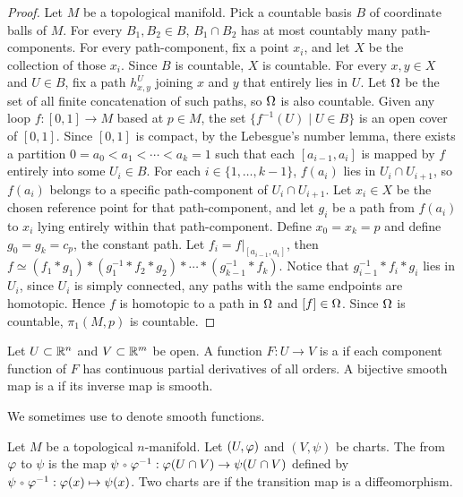 \documentclass[10pt]{article}
\begin{document}
\begin{proof}
    Let $M$ be a topological manifold. Pick a countable basis $B$ of coordinate balls of $M$. For every ${B}_{1},{B}_{2}\in B$, ${B}_{1}\cap{B}_{2}$ has at most countably many path-components. For every path-component, fix a point ${x}_{i}$, and let $X$ be the collection of those ${x}_{i}$. Since $B$ is countable, $X$ is countable. For every $x,y\in X$ and $U\in B$, fix a path ${h}_{x,y}^{U}$ joining $x$ and $y$ that entirely lies in $U$. Let $\Omega$ be the set of all finite concatenation of such paths, so $\Omega$ is also countable. Given any loop $f:[0,1]\to M$ based at $p\in M$, the set $\{{f}^{-1}(U)\mid U\in B\}$ is an open cover of $[0,1]$. Since $[0,1]$ is compact, by the Lebesgue's number lemma, there exists a partition $0={a}_{0}<{a}_{1}<\cdots<{a}_{k}=1$ such that each $[{a}_{i-1},{a}_{i}]$ is mapped by $f$ entirely into some ${U}_{i}\in B$. For each $i\in\{1,\dots,k-1\}$, $f({a}_{i})$ lies in ${U}_{i}\cap{U}_{i+1}$, so $f({a}_{i})$ belongs to a specific path-component of ${U}_{i}\cap{U}_{i+1}$. Let ${x}_{i}\in X$ be the chosen reference point for that path-component, and let ${g}_{i}$ be a path from $f({a}_{i})$ to ${x}_{i}$ lying entirely within that path-component. Define ${x}_{0}={x}_{k}=p$ and define ${g}_{0}={g}_{k}={c}_{p}$, the constant path. Let ${f}_{i}=f{|}_{[{a}_{i-1},{a}_{i}]}$, then $f\simeq({f}_{1}*{g}_{1})*({g}_{1}^{-1}*{f}_{2}*{g}_{2})*\cdots*(g_{k-1}^{-1}*{f}_{k})$. Notice that ${g}_{i-1}^{-1}*{f}_{i}*{g}_{i}$ lies in ${U}_{i}$, since ${U}_{i}$ is simply connected, any paths with the same endpoints are homotopic. Hence $f$ is homotopic to a path in $\Omega$ and $[f]\in\Omega$. Since $\Omega$ is countable, ${\pi}_{1}(M,p)$ is countable.
\end{proof}
\begin{definition}
    Let $U\subset{\mathbb{R}}^{n}$ and $V\subset{\mathbb{R}}^{m}$ be open. A function $F:U\to V$ is a  if each component function of $F$ has continuous partial derivatives of all orders. A bijective smooth map is a  if its inverse map is smooth.
\end{definition}
\par
We sometimes use  to denote smooth functions.
\begin{definition}
    Let $M$ be a topological $n$-manifold. Let $(U,\varphi)$ and $(V,\psi)$ be charts. The  from $\varphi$ to $\psi$ is the map $\psi\comp{\vp}^{-1}:\vp(U\cap V)\to\psi(U\cap V)$ defined by $\psi\comp{\vp}^{-1}:\vp(x)\mt\psi(x)$. Two charts are  if the transition map is a diffeomorphism.
\end{definition}
\end{document}
